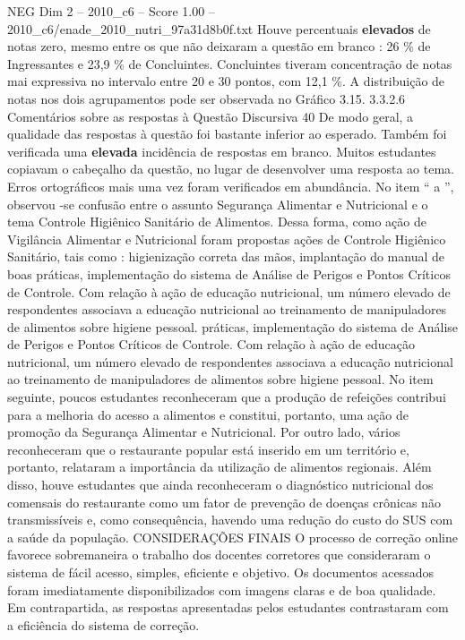 \begin{textsample}{NEG Dim 2 – 2010\_c6 – Score 1.00 – 2010\_c6/enade\_2010\_nutri\_97a31d8b0f.txt}
Houve percentuais \textbf{elevados} de notas zero, mesmo entre os que não deixaram a questão em branco : 26 \% de Ingressantes e 23,9 \% de Concluintes.
Concluintes tiveram concentração de notas mai expressiva no intervalo entre 20 e 30 pontos, com 12,1 \%.
A distribuição de notas nos dois agrupamentos pode ser observada no Gráfico 3.15. 3.3.2.6 Comentários sobre as respostas à Questão Discursiva 40 De modo geral, a qualidade das respostas à questão foi bastante inferior ao esperado.
Também foi verificada uma \textbf{elevada} incidência de respostas em branco.
Muitos estudantes copiavam o cabeçalho da questão, no lugar de desenvolver uma resposta ao tema.
Erros ortográficos mais uma vez foram verificados em abundância.
No item “ a ”, observou -se confusão entre o assunto Segurança Alimentar e Nutricional e o tema Controle Higiênico Sanitário de Alimentos.
Dessa forma, como ação de Vigilância Alimentar e Nutricional foram propostas ações de Controle Higiênico Sanitário, tais como : higienização correta das mãos, implantação do manual de boas práticas, implementação do sistema de Análise de Perigos e Pontos Críticos de Controle.
Com relação à ação de educação nutricional, um número elevado de respondentes associava a educação nutricional ao treinamento de manipuladores de alimentos sobre higiene pessoal. práticas, implementação do sistema de Análise de Perigos e Pontos Críticos de Controle.
Com relação à ação de educação nutricional, um número elevado de respondentes associava a educação nutricional ao treinamento de manipuladores de alimentos sobre higiene pessoal.
No item seguinte, poucos estudantes reconheceram que a produção de refeições contribui para a melhoria do acesso a alimentos e constitui, portanto, uma ação de promoção da Segurança Alimentar e Nutricional.
Por outro lado, vários reconheceram que o restaurante popular está inserido em um território e, portanto, relataram a importância da utilização de alimentos regionais.
Além disso, houve estudantes que ainda reconheceram o diagnóstico nutricional dos comensais do restaurante como um fator de prevenção de doenças crônicas não transmissíveis e, como consequência, havendo uma redução do custo do SUS com a saúde da população.
CONSIDERAÇÕES FINAIS O processo de correção online favorece sobremaneira o trabalho dos docentes corretores que consideraram o sistema de fácil acesso, simples, eficiente e objetivo.
Os documentos acessados foram imediatamente disponibilizados com imagens claras e de boa qualidade.
Em contrapartida, as respostas apresentadas pelos estudantes contrastaram com a eficiência do sistema de correção.

\end{textsample}

